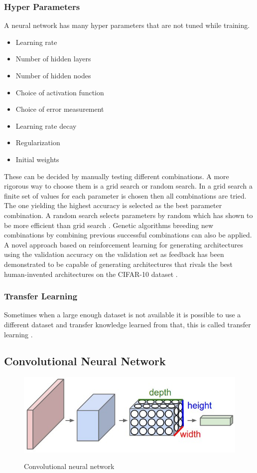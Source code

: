 \documentclass{kththesis}
\begin{document}
\subsubsection{Hyper Parameters}
A neural network has many hyper parameters that are not tuned while training. 
\begin{itemize}
\item Learning rate
\item Number of hidden layers
\item Number of hidden nodes
\item Choice of activation function
\item Choice of error measurement
\item Learning rate decay
\item Regularization
\item Initial weights
\end{itemize}
These can be decided by manually testing different combinations. A more rigorous way to choose them is a grid search or random search. In a grid search a finite set of values for each parameter is chosen then all combinations are tried. The one yielding the highest accuracy is selected as the best parameter combination. A random search selects parameters by random which has shown to be more efficient than grid search \cite{bergstra2012random}. Genetic algorithms breeding new combinations  by combining previous successful combinations can also be applied. A novel approach based on reinforcement learning for generating architectures using the validation accuracy  on the validation set as feedback has been demonstrated to be capable of generating architectures  that rivals the best human-invented architectures on the CIFAR-10 dataset \cite{DBLP:journals/corr/ZophL16}.

\subsubsection{Transfer Learning}
Sometimes when a large enough dataset is not available it is possible to use a different dataset and transfer knowledge learned from that, this is called transfer learning \cite{torrey2009transfer}.

\subsection{Convolutional Neural Network}
\begin{figure}
\centering
\includegraphics[width=\textwidth]{images/cnn.jpg}
\label{fig:cnn}
\caption{Convolutional neural network}
\end{figure}
\end{document}

